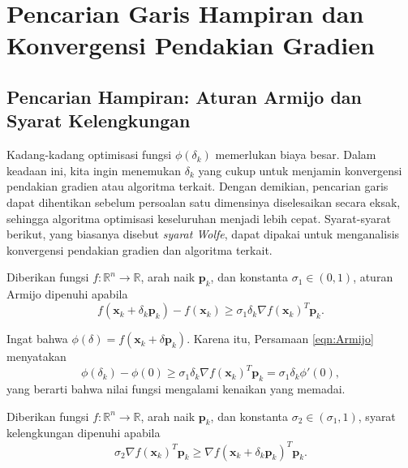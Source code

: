 \chapter{Pencarian Garis Hampiran dan Konvergensi Pendakian Gradien}
\section{Pencarian Hampiran: Aturan Armijo dan Syarat Kelengkungan}
\begin{remark} Kadang-kadang optimisasi fungsi $\phi(\delta_k)$ memerlukan biaya besar. Dalam keadaan ini, kita ingin menemukan $\delta_k$ yang cukup untuk menjamin konvergensi pendakian gradien atau algoritma terkait. Dengan demikian, pencarian garis dapat dihentikan sebelum persoalan satu dimensinya diselesaikan secara eksak, sehingga algoritma optimisasi keseluruhan menjadi lebih cepat. Syarat-syarat berikut, yang biasanya disebut \textit{syarat Wolfe}, dapat dipakai untuk menganalisis konvergensi pendakian gradien dan algoritma terkait.
\end{remark}

\begin{definition} Diberikan fungsi $f:\mathbb{R}^n \rightarrow \mathbb{R}$, arah naik $\mathbf{p}_k$, dan konstanta $\sigma_1 \in (0,1)$, aturan Armijo dipenuhi apabila
\begin{equation}
f(\mathbf{x}_k + \delta_k\mathbf{p}_k) - f(\mathbf{x}_k) \geq \sigma_1\delta_k\nabla f(\mathbf{x}_k)^T\mathbf{p}_k.
\label{eqn:Armijo}
\end{equation}
\end{definition}

\begin{remark} Ingat bahwa $\phi(\delta)=f(\mathbf{x}_k+\delta\mathbf{p}_k)$. Karena itu, Persamaan \ref{eqn:Armijo} menyatakan
\begin{equation}
\phi(\delta_k)-\phi(0)\geq \sigma_1\delta_k\nabla f(\mathbf{x}_k)^T\mathbf{p}_k
=\sigma_1\delta_k\phi'(0),
\end{equation}
yang berarti bahwa nilai fungsi mengalami kenaikan yang memadai.
\end{remark}

\begin{definition} Diberikan fungsi $f:\mathbb{R}^n \rightarrow \mathbb{R}$, arah naik $\mathbf{p}_k$, dan konstanta $\sigma_2\in(\sigma_1,1)$, syarat kelengkungan dipenuhi apabila
\begin{equation}
\sigma_2\nabla f(\mathbf{x}_k)^T\mathbf{p}_k
\geq \nabla f(\mathbf{x}_k+\delta_k\mathbf{p}_k)^T\mathbf{p}_k.
\end{equation}
\end{definition}

